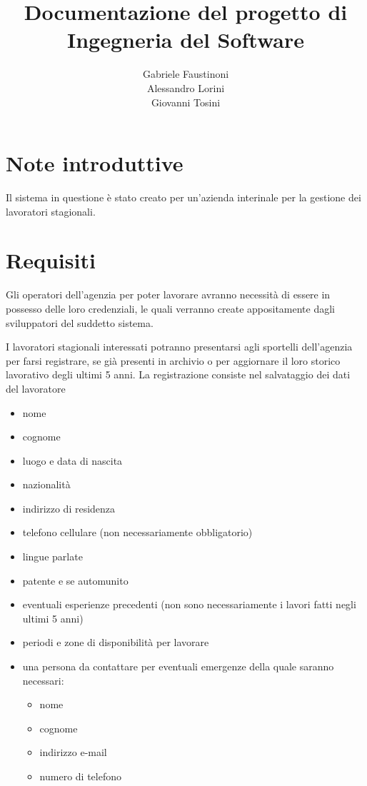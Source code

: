 \documentclass{article}
\title{Documentazione del progetto di \\ Ingegneria del Software}
\author{Gabriele Faustinoni \\ Alessandro Lorini \\ Giovanni Tosini}
\date{}
\begin{document}
    \begin{titlepage}
        \maketitle
    \end{titlepage}

    \newpage
    \tableofcontents
    \newpage

    \section{Note introduttive}

    Il sistema in questione è stato creato per un'azienda interinale 
    per la gestione dei lavoratori stagionali.

    \section{Requisiti}

    Gli operatori dell'agenzia per poter lavorare avranno necessità di essere in possesso delle loro credenziali, le quali verranno create appositamente dagli sviluppatori del suddetto sistema.

    I lavoratori stagionali interessati potranno presentarsi agli sportelli dell'agenzia per farsi registrare, se già presenti in archivio o per aggiornare il loro storico lavorativo degli ultimi 5 anni.
    La registrazione consiste nel salvataggio dei dati del lavoratore

    \begin{itemize}
        \item nome
        \item cognome
        \item luogo e data di nascita
        \item nazionalità
        \item indirizzo di residenza
        \item telefono cellulare (non necessariamente obbligatorio)
        \item lingue parlate
        \item patente e se automunito
        \item eventuali esperienze precedenti (non sono necessariamente i lavori fatti negli ultimi 5 anni)
        \item periodi e zone di disponibilità per lavorare
        \item una persona da contattare per eventuali emergenze della quale saranno necessari: 
        \begin{itemize}
            \item nome
            \item cognome
            \item indirizzo e-mail
            \item numero di telefono
        \end{itemize}
    \end{itemize}
\end{document}
